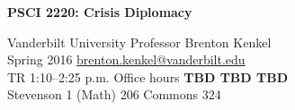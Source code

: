 \documentclass[12pt,svgnames]{article}
\begin{document}
{\Huge \textsf{\textbf{PSCI 2220: Crisis Diplomacy}}}

\textsf{%
  Vanderbilt University \hfill Professor Brenton Kenkel \\
  Spring 2016 \hfill \href{mailto:brenton.kenkel@vanderbilt.edu}{brenton.kenkel@vanderbilt.edu} \\
  TR 1:10--2:25 p.m. \hfill Office hours \textbf{TBD TBD TBD} \\
  Stevenson 1 (Math) 206 \hfill Commons 324
}

\bigskip


\end{document}
